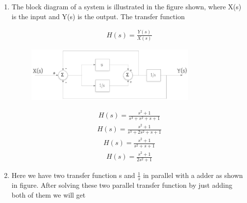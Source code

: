 


%



\begin{enumerate}[label=\thesection.\arabic*.,ref=\thesection.\theenumi]
\item
The block diagram of a system is illustrated in the figure shown, where X(s) is the input and Y(s) is the output. The transfer function

\begin{align}
 H(s)=\frac{Y(s)}{X(s)} 
\end{align}

\begin{figure}
\centering
\includegraphics[width=0.8\textwidth]{./figs/pic1.eps}
\caption{}
\label{fig:sec_order}
\end{figure}

\begin{align}
 H(s)=\frac{s^2+1}{s^3+s^2+s+1}
\end{align}
\begin{align}
 H(s)=\frac{s^2+1}{s^3+2s^2+s+1}
\end{align}
\begin{align}
 H(s)=\frac{s^2+1}{s^2+s+1}
\end{align}
\begin{align}
 H(s)=\frac{s^2+1}{2s^2+1}
\end{align}



\solution 
\item Here we have two transfer function s and $\frac{1}{s}$ in parallel with a adder as shown in figure.
After solving these two parallel transfer function by just adding both of them we will get


\end{enumerate}
